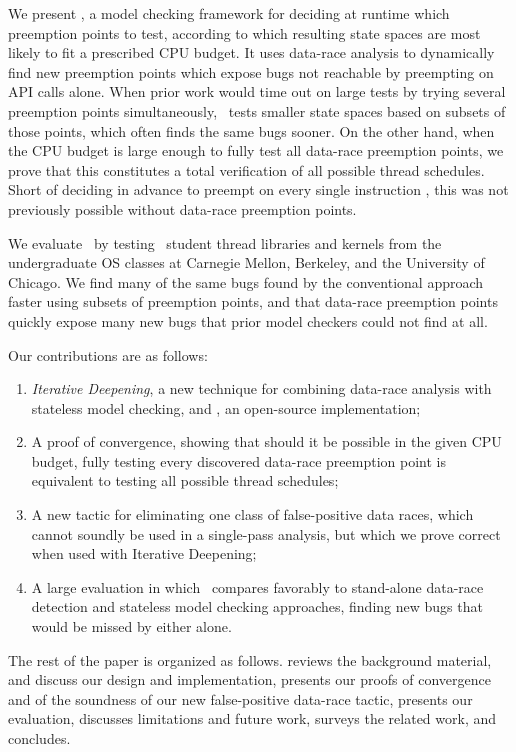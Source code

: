 We present \quicksand,
a model checking framework for deciding at runtime which preemption points to test,
according to which resulting state spaces are most likely to fit a prescribed CPU budget.
It uses data-race analysis \cite{eraser} to dynamically find new preemption points which expose bugs not reachable by preempting on API calls alone.
When prior work would time out on large tests by trying several preemption points simultaneously,
\quicksand~tests smaller state spaces based on subsets of those points, which often finds the same bugs sooner.
On the other hand, when the CPU budget is large enough to fully test all data-race preemption points,
we prove that this constitutes a total verification of all possible thread schedules.
Short of deciding in advance to preempt on every single instruction \cite{spin}, this was not previously possible without data-race preemption points.

We evaluate \quicksand~by testing \numstudence~student thread libraries and kernels from the undergraduate OS classes at Carnegie Mellon, Berkeley, and the University of Chicago.
We find many of the same bugs found by the conventional approach faster using subsets of preemption points,
and that data-race preemption points quickly expose many new bugs that prior model checkers could not find at all.

Our contributions are as follows:
\begin{enumerate}
	\item {\em Iterative Deepening}, a new technique for combining data-race analysis with stateless model checking, and \quicksand, an open-source implementation;
	\item A proof of convergence, showing that should it be possible in the given CPU budget,
		fully testing every discovered data-race preemption point is equivalent to testing all possible thread schedules;
	\item A new tactic for eliminating one class of false-positive data races,
		which cannot soundly be used in a single-pass analysis,
		but which we prove correct when used with Iterative Deepening;
	\item A large evaluation in which \quicksand~compares favorably to stand-alone data-race detection and stateless model checking approaches, finding new bugs that would be missed by either alone.
\end{enumerate}

The rest of the paper is organized as follows.
\sect{\ref{sec:overview}} reviews the background material, %
\sect{\ref{sec:design}} and \sect{\ref{sec:implementation}} discuss our design and implementation, %
\sect{\ref{sec:soundness}} presents our proofs of convergence and of the soundness of our new false-positive data-race tactic,
\sect{\ref{sec:eval}} presents our evaluation,
\sect{\ref{sec:future}} discusses limitations and future work,
\sect{\ref{sec:related}} surveys the related work,
and \sect{\ref{sec:conclusion}} concludes.
